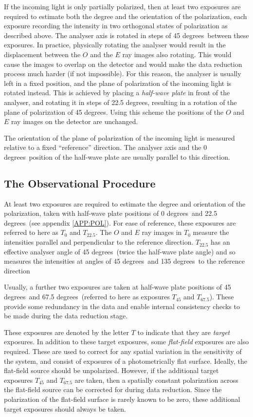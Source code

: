 \documentclass[twoside,11pt]{article}
\newcommand{\hyperref}[4]{#2\ref{#4}#3}
\newcommand{\xlabel}[1]{}
\renewcommand{\_}{\texttt{\symbol{95}}}
\newcommand{\dgs}{\hbox{$^\circ$}}
\renewcommand{\dgs}{ degrees}
\begin{document}
If the incoming light is only partially polarized, then at least two
exposures are required to estimate both the degree and the orientation of
the polarization, each exposure recording the intensity in two orthogonal
states of polarization as described above. The analyser axis is rotated
in steps of 45\dgs\ between these exposures. In practice, physically rotating
the analyser would result in the displacement between the $O$ and
the $E$ ray images also rotating. This would cause the images to overlap
on the detector and would make the data reduction process much harder (if
not impossible). For this reason, the analyser is usually left in a fixed
position, and the plane of polarization of the incoming light is rotated
instead. This is achieved by placing a \emph{half-wave plate} in
front of the analyser, and rotating it in steps of 22.5\dgs, resulting in
a rotation of the plane of polarization of 45\dgs. Using this scheme the
positions of the $O$ and $E$ ray images on the detector are unchanged.

The orientation of the plane of polarization of the incoming light is
measured relative to a fixed ``reference'' direction. The analyser axis
and the 0\dgs\ position of the half-wave plate are usually parallel to
this direction. 

\subsection{\label{SEC:OBS}\xlabel{theobservationalprocedure}The Observational Procedure}
At least two exposures are required to estimate the degree and
orientation of the polarization, taken with half-wave plate positions of
0\dgs\ and 22.5\dgs\ (see \hyperref{here}{appendix }{}{APP:POL}). For ease
of reference, these exposures are referred to here as $T_{0}$ and
$T_{22.5}$. The $O$ and $E$ ray images in $T_{0}$ measure the intensities
parallel and perpendicular to the reference direction. $T_{22.5}$ has an
effective analyser angle of 45\dgs\ (twice the half-wave plate angle) and
so measures the intensities at angles of 45\dgs\ and 135\dgs\ to the
reference direction

Usually, a further two exposures are taken at half-wave plate positions
of 45\dgs\ and 67.5\dgs\ (referred to here as exposures $T_{45}$ and
$T_{67.5}$). These provide some redundancy in the data and enable
internal consistency checks to be made during the data reduction stage.

These exposures are denoted by the letter $T$ to indicate that they are
\emph{target} exposures. In addition to these target exposures, some {\em
flat-field} exposures are also required. These are used to correct for
any spatial variation in the sensitivity of the system, and consist of
exposures of a photometrically flat surface. Ideally, the flat-field
source should be unpolarized. However, if the additional target exposures
$T_{45}$ and $T_{67.5}$ are taken, then a spatially constant polarization 
across the flat-field source can be corrected for during data reduction.
Since the polarization of the flat-field surface is rarely known to be
zero, these additional target exposures should always be taken. 
\end{document}
